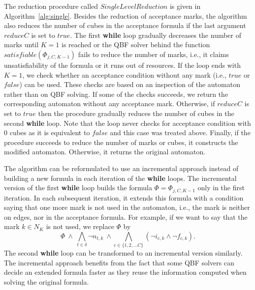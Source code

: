 \documentclass[a4paper,UKenglish,cleveref,autoref,thm-restate]{lipics-v2021}
\def\false{\mathit{false}}
\def\true{\mathit{true}}
\begin{document}
The reduction procedure called $\mathit{SingleLevelReduction}$ is
given in Algorithm~\ref{alg:single}. Besides the reduction of
acceptance marks, the algorithm also reduces the number of cubes in the acceptance formula if the last argument $\mathit{reduceC}$ is set to
$\true$.
The first \textbf{while} loop gradually decreases the number of marks
until $K=1$ is reached or the QBF solver behind the function
$\mathit{satisfiable}(\Phi_{j,C,K{-}1})$ fails to reduce
the number of marks, i.e., it claims unsatisfiability of the formula
or it runs out of resources. If the loop ends with $K=1$, we check
whether an acceptance condition without any mark (i.e., $\true$ or
$\false$) can be used. These checks are based on an inspection of the
automaton rather than on QBF solving. If some of the checks succeeds,
we return the corresponding automaton without any acceptance
mark. Otherwise, if $\mathit{reduceC}$ is set to $\true$ then the
procedure gradually reduces the number of cubes in the second
\textbf{while} loop. Note that the loop never checks for acceptance
condition with 0 cubes as it is equivalent to $\false$ and this case
was treated above. Finally, if the procedure succeeds to reduce the
number of marks or cubes, it constructs the modified
automaton. Otherwise, it returns the original automaton.

The algorithm can be reformulated to use an incremental approach
instead of building a new formula in each iteration of the
\textbf{while} loops. The incremental version of the first
\textbf{while} loop builds the formula
$\Phi=\Phi_{j,C,K{-}1}$ only in the first iteration. In
each subsequent iteration, it extends this formula with a condition
saying that one more mark is not used in the automaton, i.e., the mark
is neither on edges, nor in the acceptance formula. For example, if we
want to say that the mark $k\in N_K$ is not used, we replace $\Phi$ by
\[
  \Phi~\wedge~\bigwedge_{t\in\delta}\neg n_{t,k}~\wedge\bigwedge_{c\in\{1,2,\ldots C\}}(\neg i_{c,k}\wedge\neg f_{c,k}).
\]
The second \textbf{while} loop can be transformed to an incremental
version similarly. The incremental approach benefits from the fact
that some QBF solvers can decide an extended formula faster as they
reuse the information computed when solving the original formula.
\end{document}
